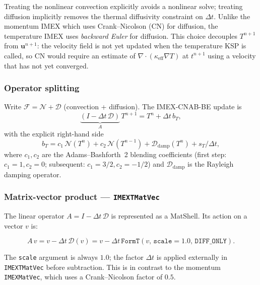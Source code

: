 \documentclass[12pt,a4paper]{article}
\begin{document}
Treating the nonlinear convection explicitly avoids a nonlinear solve;
treating diffusion implicitly removes the thermal diffusivity constraint on
$\Delta t$.  Unlike the momentum IMEX which uses Crank--Nicolson (CN) for
diffusion, the temperature IMEX uses \emph{backward Euler} for diffusion.
This choice decouples $T^{n+1}$ from $\mathbf{u}^{n+1}$: the velocity field
is not yet updated when the temperature KSP is called, so CN would require
an estimate of $\nabla\!\cdot\!(\kappa_{\text{eff}}\nabla T)$ at $t^{n+1}$
using a velocity that has not yet converged.

\subsubsection*{Operator splitting}

Write $\mathcal{F} = \mathcal{N} + \mathcal{D}$ (convection + diffusion).
The IMEX-CNAB-BE update is
\begin{equation}
  \underbrace{(I - \Delta t\,\mathcal{D})}_{A}\,T^{n+1}
  = T^n + \Delta t\,b_T,
  \label{eq:teqn-imex-system}
\end{equation}
with the explicit right-hand side
\begin{equation}
  b_T = c_1\,\mathcal{N}(T^n) + c_2\,\mathcal{N}(T^{n-1})
       + \mathcal{D}_{\text{damp}}(T^n) + s_T / \Delta t,
  \label{eq:bT}
\end{equation}
where $c_1, c_2$ are the Adams--Bashforth~2 blending coefficients
(first step: $c_1{=}1, c_2{=}0$; subsequent: $c_1{=}3/2, c_2{=}{-}1/2$)
and $\mathcal{D}_{\text{damp}}$ is the Rayleigh damping operator.

\subsubsection*{Matrix-vector product — \texttt{IMEXTMatVec}}

The linear operator $A = I - \Delta t\,\mathcal{D}$ is represented as a
MatShell.  Its action on a vector $v$ is:

\begin{equation}
  A\,v = v - \Delta t\,\mathcal{D}(v)
       = v - \Delta t\,\texttt{FormT}(v,\,\texttt{scale}{=}1.0,\,\texttt{DIFF\_ONLY}).
  \label{eq:IMEXTMatVec}
\end{equation}

The \texttt{scale} argument is always $1.0$; the factor $\Delta t$ is applied
externally in \texttt{IMEXTMatVec} before subtraction.
This is in contrast to the momentum \texttt{IMEXMatVec}, which uses a
Crank--Nicolson factor of $0.5$.
\end{document}
